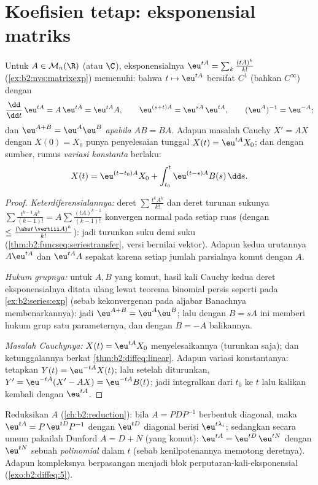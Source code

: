 \section{Koefisien tetap: eksponensial matriks}

\begin{theorem}\label{thm:b2:diffeq:matrixexp}
Untuk $A \in \mathcal{M}_n(\R)$ (atau $\C$), eksponensialnya $\eu^{tA}
= \sum_k \frac{(tA)^k}{k!}$ (\cref{ex:b2:nvs:matrixexp}) memenuhi:
bahwa $t \mapsto \eu^{tA}$ bersifat $C^1$ (bahkan $C^\infty$)
dengan
\[
\frac{\dd}{\dd t}\,\eu^{tA} = A\,\eu^{tA} = \eu^{tA}A ,
\qquad
\eu^{(s+t)A} = \eu^{sA}\,\eu^{tA},
\qquad
(\eu^{A})^{-1} = \eu^{-A} ;
\]
dan $\eu^{A + B} = \eu^A\eu^B$ \emph{apabila} $AB = BA$. Adapun masalah
Cauchy $X' = AX$ dengan $X(0) = X_0$ punya penyelesaian tunggal $X(t) =
\eu^{tA}X_0$; dan dengan sumber, rumus \emph{variasi konstanta}
berlaku:
\[
X(t) = \eu^{(t - t_0)A}X_0 + \int_{t_0}^{t} \eu^{(t-s)A}B(s)\,\dd
s .
\]
\end{theorem}

\begin{proof}
\emph{Keterdiferensialannya:} deret $\sum \frac{t^kA^k}{k!}$ dan
deret turunan sukunya $\sum \frac{t^{k-1}A^k}{(k-1)!} = A\sum
\frac{(tA)^{k-1}}{(k-1)!}$ konvergen normal pada setiap ruas
(dengan  $\leq \frac{(\abs t\,\vertiii A)^k}{k!}$): jadi turunkan
suku demi suku (\cref{thm:b2:funcseq:seriestransfer}, versi bernilai vektor).
Adapun kedua urutannya $A\eu^{tA}$ dan $\eu^{tA}A$ sepakat karena setiap
jumlah parsialnya komut dengan $A$.

\emph{Hukum grupnya:} untuk $A, B$ yang komut, hasil kali Cauchy kedua
deret eksponensialnya ditata ulang lewat teorema binomial persis
seperti pada \cref{ex:b2:series:exp} (sebab kekonvergenan  pada aljabar
Banachnya membenarkannya): jadi $\eu^{A+B} = \eu^A\eu^B$; lalu dengan $B = sA$ ini
memberi hukum grup satu parameternya, dan dengan $B = -A$ balikannya.

\emph{Masalah Cauchynya:} $X(t) = \eu^{tA}X_0$ menyelesaikannya (turunkan saja);
dan ketunggalannya berkat \cref{thm:b2:diffeq:linear}. Adapun variasi konstantanya:
tetapkan $Y(t) = \eu^{-tA}X(t)$; lalu setelah diturunkan, $Y' = \eu^{-tA}(X' -
AX) = \eu^{-tA}B(t)$; jadi integralkan dari $t_0$ ke $t$ lalu kalikan
kembali dengan $\eu^{tA}$.
\end{proof}

\begin{method}[Menghitung $\eu^{tA}$]\label{met:b2:diffeq:computeexp}
Reduksikan $A$ (\cref{ch:b2:reduction}): bila $A = PDP^{-1}$ berbentuk diagonal,
maka $\eu^{tA} = P\,\eu^{tD}P^{-1}$ dengan $\eu^{tD}$ diagonal berisi
$\eu^{t\lambda_i}$; sedangkan secara umum pakailah Dunford $A = D + N$
(yang komut): $\eu^{tA} = \eu^{tD}\,\eu^{tN}$ dengan $\eu^{tN}$ sebuah
\emph{polinomial} dalam $t$ (sebab kenilpotenannya memotong deretnya). Adapun  kompleksnya berpasangan menjadi blok perputaran-kali-eksponensial
(\cref{exo:b2:diffeq:5}).
\end{method}

